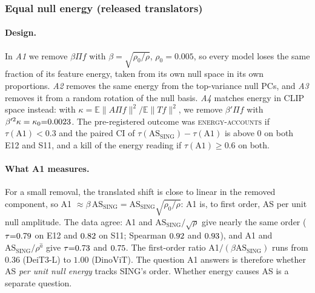 \documentclass[10pt]{article}
\newcommand{\ASS}{\mathrm{AS}_{\mathrm{SING}}}
\begin{document}
\begin{table}[t]
\centering\small

\caption{Kendall $\tau$ against SING's order (percentile 95\% CI, 2000 model resamples). E12 drops DenseNet ($\rho<\rho_0$); S11 also drops BiT. A1$^\prime$ gives the same order as A1 because, for each model, AS is monotone in the removed fraction. $^\dagger$Post hoc: ridge penalty chosen on an extended grid $10^{3..6}$, since the pre-registered grid put every model at its upper edge.}
\label{tab:tau}
\end{table}


\subsubsection{Equal null energy (released translators)}
\label{sec:equal}
\paragraph{Design.} In \emph{A1} we remove $\beta\Pi f$ with $\beta=\sqrt{\rho_0/\rho}$, $\rho_0{=}0.005$, so every model loses the same fraction of its feature energy, taken from its own null space in its own proportions.
\emph{A2} removes the same energy from the top-variance null PCs, and \emph{A3} removes it from a random rotation of the null basis.
\emph{A4} matches energy in CLIP space instead: with $\kappa=\mathbb{E}\|A\Pi f\|^2/\mathbb{E}\|T f\|^2$, we remove $\beta'\Pi f$ with $\beta'^2\kappa=\kappa_0{=}0.0023$.
The pre-registered outcome was \textsc{energy-accounts} if $\tau(\text{A1})<0.3$ and the paired CI of $\tau(\ASS)-\tau(\text{A1})$ is above 0 on both E12 and S11, and a kill of the energy reading if $\tau(\text{A1})\ge0.6$ on both.

\paragraph{What A1 measures.}
For a small removal, the translated shift is close to linear in the removed component, so A1 $\approx\beta\,\ASS=\ASS\sqrt{\rho_0/\rho}$: A1 is, to first order, AS per unit null amplitude.
The data agree: A1 and $\ASS/\sqrt\rho$ give nearly the same order ($\tau{=}0.79$ on E12 and $0.82$ on S11; Spearman $0.92$ and $0.93$), and A1 and $\ASS/\rho^{\hat a}$ give $\tau{=}0.73$ and $0.75$.
The first-order ratio A1$/(\beta\ASS)$ runs from $0.36$ (DeiT3-L) to $1.00$ (DinoViT).
The question A1 answers is therefore whether AS \emph{per unit null energy} tracks SING's order. Whether energy causes AS is a separate question.
\end{document}
